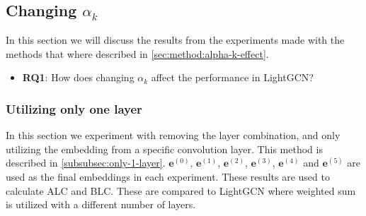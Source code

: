 \subsection{Changing $\alpha_k$}
In this section we will discuss the results from the experiments made with the methods that where described in \autoref{sec:method:alpha-k-effect}.
\begin{itemize}
    \item \textbf{RQ1}: How does changing $\alpha_k$ affect the performance in LightGCN?
\end{itemize}

\subsubsection{Utilizing only one layer}
In this section we experiment with removing the layer combination, and only utilizing the embedding from a specific convolution layer.
This method is described in \autoref{subsubsec:only-1-layer}.
$\mathbf{e}^{(0)}$, $\mathbf{e}^{(1)}$, $\mathbf{e}^{(2)}$, $\mathbf{e}^{(3)}$, $\mathbf{e}^{(4)}$ and $\mathbf{e}^{(5)}$ are used as the final embeddings in each experiment.
These results are used to calculate ALC and BLC.
These are compared to LightGCN where weighted sum is utilized with a different number of layers.
